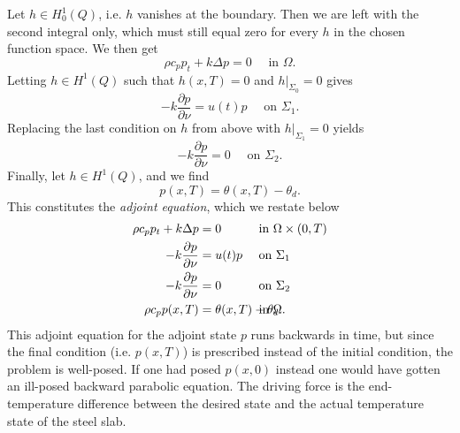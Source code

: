 Let $h\in H_0^1(Q)$, i.e. $h$ vanishes at the boundary. Then we are left with the second integral only, which must still equal zero for every $h$ in the chosen function space. We then get
\begin{equation*}
  \rho c_p p_t + k\Delta p = 0 \quad\textrm{ in } \Omega.
\end{equation*}
Letting $h\in H^1(Q)$ such that $h(x, T) = 0$ and $h|_{\Sigma_0}=0$ gives
\begin{equation*}
  -k\frac{\partial p}{\partial\nu} = u(t)p \quad\textrm{ on } \Sigma_1.
\end{equation*}
Replacing the last condition on $h$ from above with $h|_{\Sigma_1}=0$ yields
\begin{equation*}
  -k\frac{\partial p}{\partial\nu} = 0 \quad\textrm{ on } \Sigma_2.
\end{equation*}
Finally, let $h\in H^1(Q)$, and we find
\begin{equation*}
  p(x, T) = \theta(x, T) - \theta_d.
\end{equation*}
This constitutes the \textit{adjoint equation}, which we restate below
\begin{subequations}\label{eq:adjoint-system}
   \begin{align} %
      \rho c_p p_t + k\Delta p &= 0 &&\textrm{ in } \Omega \times (0,T) \label{eq:adjoint-system-eqn} \\
      {-k}\frac{\partial p}{\partial\nu} &= u(t)p &&\textrm{ on } \Sigma_1 \label{eq:adjoint-system-bd-1} \\
      {-k}\frac{\partial p}{\partial\nu} &= 0 &&\textrm{ on } \Sigma_2 \label{eq:adjoint-system-bd-2} \\
      \rho c_p p(x, T) &= \theta(x, T) - \theta_d \hspace{-3em}&&\textrm{ in } \Omega.
   \end{align}
   \label{eq:adjoint-eqn}
\end{subequations}
This adjoint equation for the adjoint state $p$ runs backwards in time, but since the final condition (i.e. $p(x,T)$) is prescribed instead of the initial condition, the problem is well-posed. If one had posed $p(x, 0)$ instead one would have gotten an ill-posed backward parabolic equation. The driving force is the end-temperature difference between the desired state and the actual temperature state of the steel slab.

